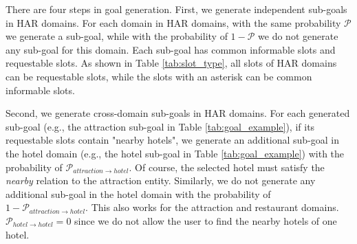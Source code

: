 There are four steps in goal generation. 
First, we generate independent sub-goals in HAR domains.
For each domain in HAR domains, with the same probability $\mathcal{P}$ we generate a sub-goal, while with the probability of $1-\mathcal{P}$ we do not generate any sub-goal for this domain. 
Each sub-goal has common informable slots and requestable slots. As shown in Table \ref{tab:slot_type}, all slots of HAR domains can be requestable slots, while the slots with an asterisk can be common informable slots. 

Second, we generate cross-domain sub-goals in HAR domains. For each generated sub-goal (e.g., the attraction sub-goal in Table \ref{tab:goal_example}), if its requestable slots contain "nearby hotels", we generate an additional sub-goal in the hotel domain (e.g., the hotel sub-goal in Table \ref{tab:goal_example}) with the probability of $\mathcal{P}_{attraction\rightarrow hotel}$. Of course, the selected hotel must satisfy the \emph{nearby} relation to the attraction entity. 
Similarly, we do not generate any additional sub-goal in the hotel domain with the probability of $1-\mathcal{P}_{attraction\rightarrow hotel}$.
This also works for the attraction and restaurant domains. $\mathcal{P}_{hotel\rightarrow hotel}=0$ since we do not allow the user to find the nearby hotels of one hotel.

